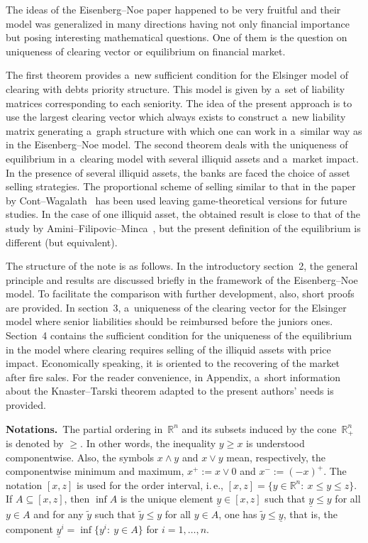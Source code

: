 \begin{multicols}{2}
The ideas of the  Eisenberg--Noe paper happened to be very fruitful and their 
model
was generalized in many directions having not only financial importance but 
posing  interesting mathematical questions. One of them is the question on 
uniqueness of clearing vector or   equilibrium  on financial market.

The first theorem provides a~new sufficient condition for the Elsinger model of 
clearing with debts priority structure. This model is given by a~set of 
liability matrices corresponding to each seniority. The idea of the present approach is 
to use the largest clearing vector which always exists to construct a~new 
liability matrix generating a~graph structure with which one can work in 
a~similar way as in the Eisenberg--Noe model.
The second theorem deals with the uniqueness of  equilibrium in a~clearing  
model with several illiquid assets and a~market impact.  In the presence of 
several illiquid assets,  the banks are faced the choice of  asset selling 
strategies. The proportional scheme of selling similar to that in the 
paper by Cont--Wagalath~\cite{Cont-Wag} has been used 
leaving game-theoretical versions for 
future studies.  In the case of one illiquid asset, the
obtained result is close to that  
of the study by Amini--Filipovic--Minca~\cite{AFM}, but the present definition of the 
equilibrium is different (but equivalent).

The structure of the note is as follows. In the introductory section~2, 
 the general principle and results are discussed briefly in the framework of the 
Eisenberg--Noe model. To facilitate the comparison with further development, 
also, short proofs are provided.
In section~3, a~uniqueness of the clearing vector for the Elsinger model 
where senior  liabilities should be reimbursed before the juniors ones. Section~4 
contains
the sufficient condition  for the uniqueness of the equilibrium in the model
where clearing requires selling of the illiquid assets with price impact.  
Economically speaking, it is  oriented to the recovering of the market  after 
fire sales.  For the reader convenience,  in Appendix, 
a~short information about the Knaster--Tarski theorem adapted to 
the present authors' needs is provided.



\noindent
\textbf{Notations.}\ The partial ordering in~$\mathbb{R}^n$ and its 
subsets  induced by the cone~$\mathbb{R}^n_+$ is denoted by $\ge$. In other words, the inequality $y\ge x$ 
is understood componentwise. Also, the symbols $x\wedge y$ and $x\vee y$ mean, 
respectively, the componentwise minimum and maximum, $x^+:=x\vee 0$ and\linebreak 
$x^-:=(- x)^+$.
The notation $[x,z]$ is used for the order interval, i.\,e.,
$[x,z]=\{y\in \mathbb{R}^n:\ x\le y\le z \}$.
If $A\subseteq [x,z]$, then $\inf A$ is the unique element $\underline y\in 
[x,z]$ such
that $\underline y\le y$ for all $y\in A$ and for any $\tilde y$  such that 
$\tilde y\le y$ for all $y\in A$, one has $\tilde y\le \underline y$, that 
is, the component $\underline y^i=\inf \{y^i:\ y\in A\}$ for  $i=1,\dots,n$.


\end{multicols}
